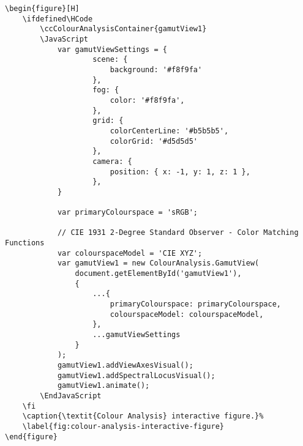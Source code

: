 \begin{lstlisting}[caption={\textit{Colour Analysis} interactive figure.}]
\begin{figure}[H]
    \ifdefined\HCode
        \ccColourAnalysisContainer{gamutView1}
        \JavaScript
            var gamutViewSettings = {
                    scene: {
                        background: '#f8f9fa'
                    },
                    fog: {
                        color: '#f8f9fa',
                    },
                    grid: {
                        colorCenterLine: '#b5b5b5',
                        colorGrid: '#d5d5d5'
                    },
                    camera: {
                        position: { x: -1, y: 1, z: 1 },
                    },
            }

            var primaryColourspace = 'sRGB';

            // CIE 1931 2-Degree Standard Observer - Color Matching Functions
            var colourspaceModel = 'CIE XYZ';
            var gamutView1 = new ColourAnalysis.GamutView(
                document.getElementById('gamutView1'),
                {
                    ...{
                        primaryColourspace: primaryColourspace,
                        colourspaceModel: colourspaceModel,
                    },
                    ...gamutViewSettings
                }
            );
            gamutView1.addViewAxesVisual();
            gamutView1.addSpectralLocusVisual();
            gamutView1.animate();
        \EndJavaScript
    \fi
    \caption{\textit{Colour Analysis} interactive figure.}%
    \label{fig:colour-analysis-interactive-figure}
\end{figure}
\end{lstlisting}

